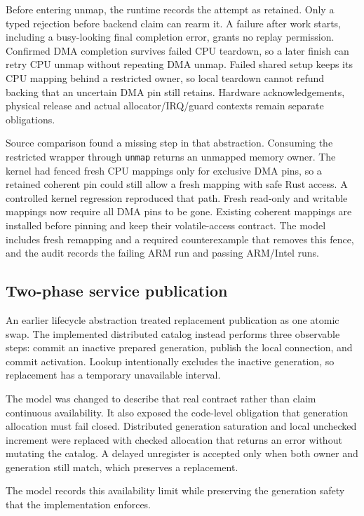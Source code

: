 Before entering unmap, the runtime records the attempt as retained. Only a
typed rejection before backend claim can rearm it. A failure after work starts,
including a busy-looking final completion error, grants no replay permission.
Confirmed DMA completion survives failed CPU teardown, so a later finish can
retry CPU unmap without repeating DMA unmap. Failed shared setup keeps its CPU
mapping behind a restricted owner, so local teardown cannot refund backing that
an uncertain DMA pin still retains. Hardware acknowledgements, physical release
and actual allocator/IRQ/guard contexts remain separate obligations.

Source comparison found a missing step in that abstraction. Consuming the
restricted wrapper through \texttt{unmap} returns an unmapped memory owner.
The kernel had fenced fresh CPU mappings only for exclusive DMA pins, so a
retained coherent pin could still allow a fresh mapping with safe Rust access.
A controlled kernel regression reproduced that path. Fresh read-only and
writable mappings now require all DMA pins to be gone. Existing coherent
mappings are installed before pinning and keep their volatile-access contract.
The model includes fresh remapping and a required counterexample that removes
this fence, and the audit records the failing ARM run and passing ARM/Intel runs.

\subsection{Two-phase service publication}

An earlier lifecycle abstraction treated replacement publication as one
atomic swap. The implemented distributed catalog instead performs three
observable steps: commit an inactive prepared generation, publish the local
connection, and commit activation. Lookup intentionally excludes the inactive
generation, so replacement has a temporary unavailable interval.

The model was changed to describe that real contract rather than claim
continuous availability. It also exposed the code-level obligation that
generation allocation must fail closed. Distributed generation saturation and
local unchecked increment were replaced with checked allocation that returns
an error without mutating the catalog. A delayed unregister is accepted only
when both owner and generation still match, which preserves a replacement.

The model records this availability limit while preserving the generation
safety that the implementation enforces.

